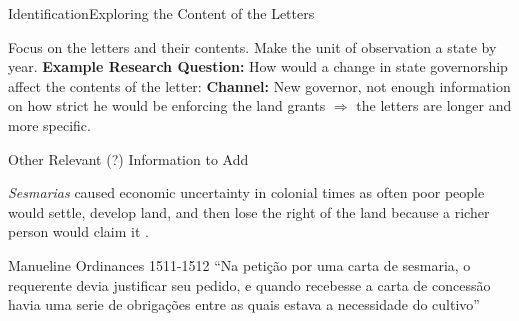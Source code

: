 \documentclass[aspectratio=1610]{beamer}
\begin{document}
\begin{frame}{Identification}{Exploring the Content of the Letters}
    \begin{outline}
        \1 Focus on the letters and their contents. 
        \vspace{2mm}
        \1 Make the unit of observation a state by year. 
        \vspace{2mm}
        \1 \textbf{Example Research Question:} How would a change in state governorship affect the contents of the letter:
        \vspace{1mm}
            \2 \textbf{Channel:} New governor, not enough information on how strict he would be enforcing the land grants $\Rightarrow$ the letters are longer and more specific.
        \vspace{1mm}
    \end{outline}
\end{frame}

\begin{frame}{Other Relevant (?) Information to Add}
    \begin{outline}
        \1 \textit{Sesmarias} caused economic uncertainty in colonial times as often poor people would settle, develop land, and then lose the right of the land because a richer person would claim it \parencite[p.~142]{Da_Costa_Porto1979-dz}.
    \end{outline}
\end{frame}

\begin{frame}{Manueline Ordinances 1511-1512}
    ``Na petição por uma carta de sesmaria, o requerente devia justificar seu pedido, e quando recebesse a carta de concessão havia uma serie de obrigações entre as quais estava a necessidade do cultivo''
\end{frame}


\end{document}
